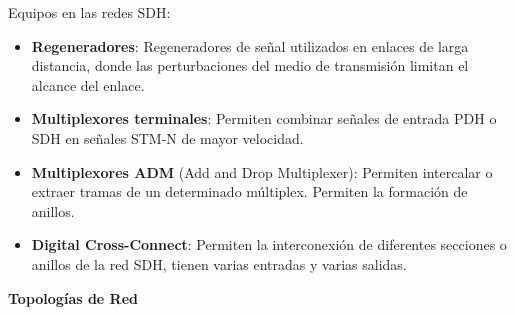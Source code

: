 \documentclass[10pt,portrait, twocolumn]{article}
\begin{document}
Equipos en las redes SDH:

\begin{itemize}
	\item \textbf{Regeneradores}: Regeneradores de señal utilizados en enlaces de larga distancia, donde las perturbaciones del medio de transmisión limitan el alcance del enlace.
	\item \textbf{Multiplexores terminales}: Permiten combinar señales de entrada PDH o SDH en señales STM-N de mayor velocidad.
	\item \textbf{Multiplexores ADM} (Add and Drop Multiplexer): Permiten intercalar o extraer tramas de un determinado múltiplex. Permiten la formación de anillos.
	\item \textbf{Digital Cross-Connect}: Permiten la interconexión de diferentes secciones o anillos de la red SDH, tienen varias entradas y varias salidas.
\end{itemize}

\textbf{Topologías de Red}
\end{document}
